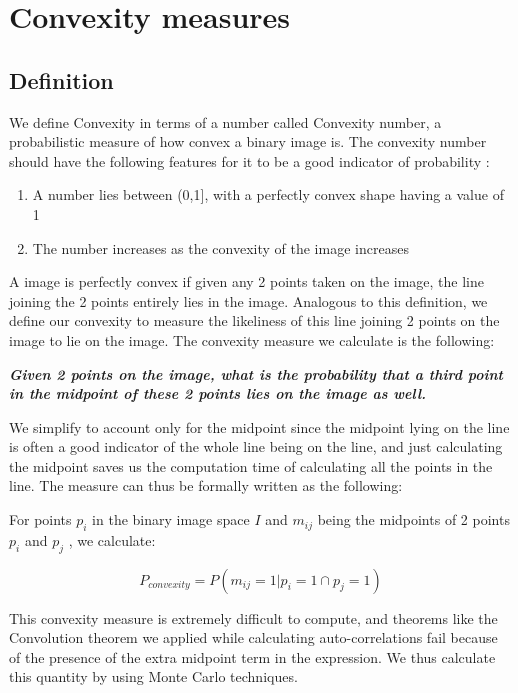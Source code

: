 \documentclass[12pt, a4paper]{report}
\begin{document}
\section{Convexity measures}

\subsection{Definition}
We define Convexity in terms of a number called Convexity number, a probabilistic measure of how convex a binary image is. The convexity number should have the following features for it to be a good indicator of probability \cite{31rahtu2006new}:
\begin{enumerate}
    \item A number lies between (0,1], with a perfectly convex shape having a value of 1
    \item The number increases as the convexity of the image increases
\end{enumerate}

A image is perfectly convex if given any 2 points taken on the image, the line joining the 2 points entirely lies in the image. Analogous to this definition, we define our convexity to measure the likeliness of this line joining 2 points on the image to lie on the image. The convexity measure we calculate is the following:

\textbf{\textit{Given 2 points on the image, what is the probability that a third point in the midpoint of these 2 points lies on the image as well.}}

We simplify to account only for the midpoint since the midpoint lying on the line is often a good indicator of the whole line being on the line, and just calculating the midpoint saves us the computation time of calculating all the points in the line. The measure can thus be formally written as the following:


For points $p_i$ in the binary image space $I$ and $m_{ij}$ being the midpoints of 2 points $p_i$ and $p_j$ , we calculate:

\begin{equation}
    P_{convexity} = P(m_{ij} = 1 | p_i = 1 \cap p_j = 1 )
\end{equation}


This convexity measure is extremely difficult to compute, and theorems like the Convolution theorem we applied while calculating auto-correlations fail because of the presence of the extra midpoint term in the expression. We thus calculate this quantity by using Monte Carlo techniques.
\end{document}
